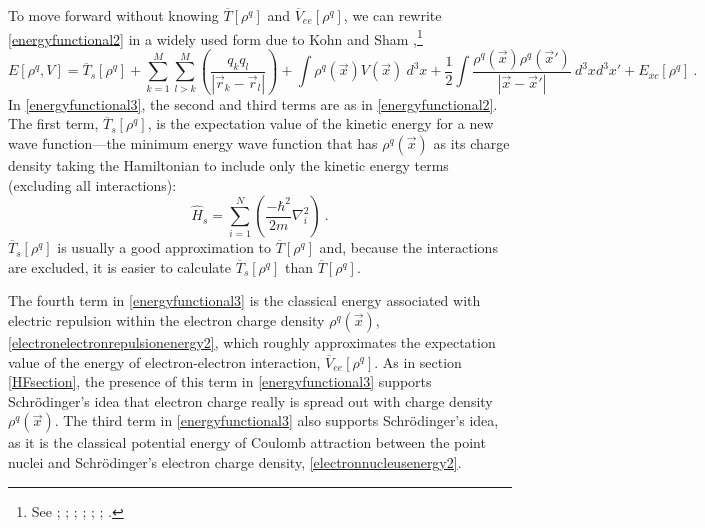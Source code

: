 \documentclass[onecolumn,secnumarabic,amsmath,amssymb,balancelastpage,nofootinbib]{article}
\begin{document}
To move forward without knowing $\overline{T}[\rho^q]$ and $\overline{V}_{ee}[\rho^q]$, we can rewrite \eqref{energyfunctional2} in a widely used form due to Kohn and Sham \cite{kohn1965},\footnote{See \cite[eq.\ 7.1.1 \& 7.1.13]{parryang}; \cite[eq.\ 3.14]{baerends1997}; \cite[eq.\ 5.11]{koch2001}; \cite[eq.\ 7.5]{martin2004}; \cite[pg.\ 320]{atkins2011}; \cite[eq.\ 18]{becke2014}; \cite[eq.\ 16.44]{levineQC}.}
\begin{equation}
E[\rho^q,V]=\overline{T}_s[\rho^q]+\sum_{k=1}^{M}\sum_{l>k}^{M} \left(\frac{q_k q_l}{|\vec{r}_k-\vec{r}_l|}\right)+\int{\rho^q(\vec{x}) V(\vec{x}) \  d^3 x}+\frac{1}{2}\int{\frac{\rho^q(\vec{x}) \rho^q(\vec{x}')}{|\vec{x}-\vec{x}'|}\  d^3 x d^3 x'}+E_{xc}[\rho^q]
\ .
\label{energyfunctional3}
\end{equation}
In \eqref{energyfunctional3}, the second and third terms are as in \eqref{energyfunctional2}.  The first term, $\overline{T}_s[\rho^q]$, is the expectation value of the kinetic energy for a new wave function---the minimum energy wave function that has $\rho^q(\vec{x})$ as its charge density taking the Hamiltonian to include only the kinetic energy terms (excluding all interactions):
\begin{equation}
\widehat{H}_s= \sum_{i=1}^{N}\left(\frac{-\hbar^2}{2 m} \nabla_i^2 \right)
\ .
\label{hamiltonianK}
\end{equation}
$\overline{T}_s[\rho^q]$ is usually a good approximation to $\overline{T}[\rho^q]$ and, because the interactions are excluded, it is easier to calculate $\overline{T}_s[\rho^q]$ than $\overline{T}[\rho^q]$.

The fourth term in \eqref{energyfunctional3} is the classical energy associated with electric repulsion within the electron charge density $\rho^q(\vec{x})$, \eqref{electronelectronrepulsionenergy2}, which roughly approximates the expectation value of the energy of electron-electron interaction, $\overline{V}_{ee}[\rho^q]$.  As in section \ref{HFsection}, the presence of this term in \eqref{energyfunctional3} supports Schr\"{o}dinger's idea that electron charge really is spread out with charge density $\rho^q(\vec{x})$.  The third term in \eqref{energyfunctional3} also supports Schr\"{o}dinger's idea, as it is the classical potential energy of Coulomb attraction between the point nuclei and Schr\"{o}dinger's electron charge density, \eqref{electronnucleusenergy2}.
\end{document}
